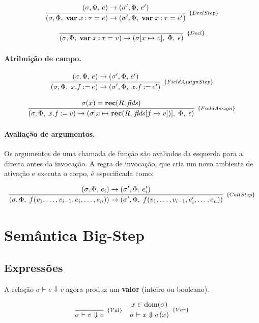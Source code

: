 \[
  \infer[_{\{DeclStep\}}]
  {(\sigma, \Phi,\; \mathbf{var}\; x \mathbin{:} \tau = e) \to
  (\sigma', \Phi,\; \mathbf{var}\; x \mathbin{:} \tau = e')}
  {(\sigma, \Phi,\, e) \to (\sigma', \Phi,\, e')}
\]

\[
  \infer[_{\{Decl\}}]
  {(\sigma, \Phi,\; \mathbf{var}\; x \mathbin{:} \tau = v) \to
  (\sigma[x \mapsto v],\; \Phi,\; \epsilon)}
  {}
\]

\paragraph{Atribuição de campo.}

\[
  \infer[_{\{FieldAssignStep\}}]
  {(\sigma, \Phi,\; x.f \mathbin{:=} e) \to
  (\sigma', \Phi,\; x.f \mathbin{:=} e')}
  {(\sigma, \Phi,\, e) \to (\sigma', \Phi,\, e')}
\]

\[
  \infer[_{\{FieldAssign\}}]
  {(\sigma, \Phi,\; x.f \mathbin{:=} v)
    \to (\sigma[x \mapsto \mathbf{rec}(R,\,\mathit{flds}[f \mapsto
  v])],\; \Phi,\; \epsilon)}
  {\sigma(x) = \mathbf{rec}(R,\mathit{flds})}
\]

\paragraph{Avaliação de argumentos.}

Os argumentos de uma chamada de função são avaliados da esquerda para
a direita antes da invocação. A regra de invocação, que cria um
novo ambiente de ativação e executa o corpo, é especificada como:

\[
  \infer[_{\{CallStep\}}]
  {(\sigma, \Phi,\;
    f(v_1,\ldots,v_{i-1},e_i,\ldots,e_n)) \to
    (\sigma', \Phi,\;
  f(v_1,\ldots,v_{i-1},e_i',\ldots,e_n))}
  {(\sigma, \Phi,\, e_i) \to (\sigma', \Phi,\, e_i')}
\]

\section{Semântica Big-Step}

\subsection{Expressões}

A relação \(\sigma \vdash e \Downarrow v\) agora produz um
\textbf{valor} (inteiro ou booleano).

\[
  \begin{array}{cc}
    \infer[_{\{Val\}}]{\sigma \vdash v \Downarrow v}{}
    &
    \infer[_{\{Var\}}]{\sigma \vdash x
    \Downarrow \sigma(x)}{x \in \mathrm{dom}(\sigma)}
  \end{array}
\]

